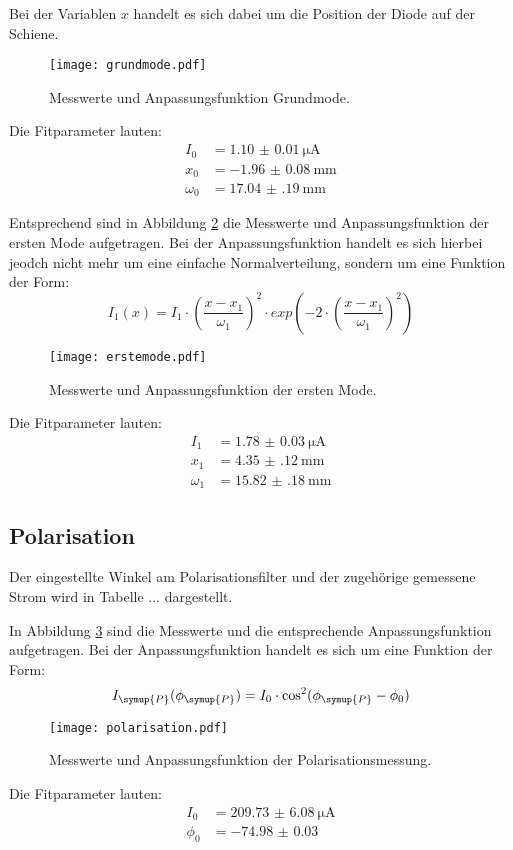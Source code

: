 Bei der Variablen $x$ handelt es sich dabei um die Position der Diode auf der Schiene.

\begin{figure}[H]
  \centering
  \texttt{[image: grundmode.pdf]}
  \caption{Messwerte und Anpassungsfunktion Grundmode.}
  \label{fig:grundmode}
\end{figure}

Die Fitparameter lauten:
\begin{align*}
  I_0 &= \SI{1.10(1)}{\micro\ampere} \\
  x_0 &= \SI{-1.96(8)}{\milli\meter} \\
  \omega_0 &= \SI{17.04(19)}{\milli\meter}
\end{align*}

Entsprechend sind in Abbildung \ref{fig:erstemode} die Messwerte und Anpassungsfunktion
der ersten Mode aufgetragen. Bei der Anpassungsfunktion handelt es sich hierbei jeodch
nicht mehr um eine einfache Normalverteilung, sondern um eine Funktion der Form:
\begin{equation*}
  I_{1}(x) = I_1 \cdot \left(\frac{x - x_1}{\omega_1}\right)^2 \cdot exp\left(-2 \cdot \left(\frac{x - x_1}{\omega_1}\right)^2\right)
\end{equation*}

\begin{figure}[H]
  \centering
  \texttt{[image: erstemode.pdf]}
  \caption{Messwerte und Anpassungsfunktion der ersten Mode.}
  \label{fig:erstemode}
\end{figure}

Die Fitparameter lauten:
\begin{align*}
  I_1 &= \SI{1.78(3)}{\micro\ampere} \\
  x_1 &= \SI{4.35(12)}{\milli\meter} \\
  \omega_1 &= \SI{15.82(18)}{\milli\meter}
\end{align*}

\subsection{Polarisation}
Der eingestellte Winkel am Polarisationsfilter und der zugehörige gemessene Strom
wird in Tabelle ... dargestellt.

In Abbildung \ref{fig:polarisation} sind die Messwerte und die entsprechende
Anpassungsfunktion aufgetragen. Bei der Anpassungsfunktion handelt es sich um eine
Funktion der Form:
\begin{equation*}
  I_\symup{P}(\phi_\symup{P}) = I_0 \cdot \cos^2(\phi_\symup{P} - \phi_0)
\end{equation*}

\begin{figure}[H]
  \centering
  \texttt{[image: polarisation.pdf]}
  \caption{Messwerte und Anpassungsfunktion der Polarisationsmessung.}
  \label{fig:polarisation}
\end{figure}

Die Fitparameter lauten:
\begin{align*}
  I_0 &= \SI{209.73(608)}{\micro\ampere} \\
  \phi_0 &= \SI{-74.98(3)}{}
\end{align*}
